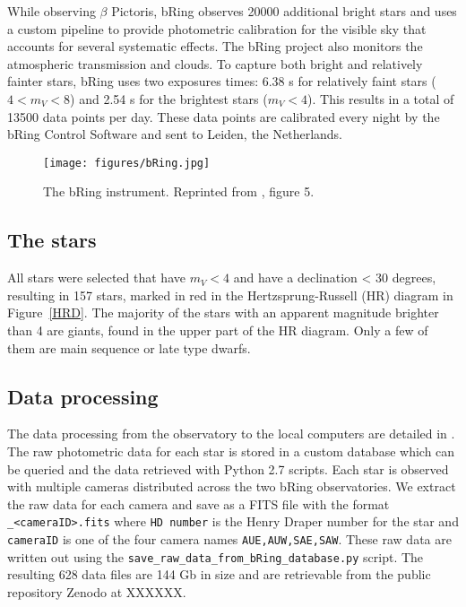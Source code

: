 \documentclass{aa}
\begin{document}
While observing $\beta$ Pictoris, bRing observes 20000 additional bright stars and uses a custom pipeline to provide photometric calibration for the visible sky that accounts for several systematic effects.
%
The bRing project also monitors the atmospheric transmission and clouds.
%
To capture both bright and relatively fainter stars, bRing uses two exposures times: 6.38 s for relatively faint stars ($4 < m_V < 8$) and 2.54 s for the brightest stars ($m_V < 4$). This results in a total of 13500 data points per day.
%
These data points are calibrated every night by the bRing Control Software and sent to Leiden, the Netherlands.

\begin{figure}
    \centering
    \texttt{[image: figures/bRing.jpg]}
    \caption{The bRing instrument. Reprinted from \cite{bRing}, figure 5.}
    \label{bRing}
\end{figure}

\subsection{The stars}

All stars were selected that have $m_V<4$ and have a declination < 30 degrees, resulting in 157 stars, marked in red in the Hertzsprung-Russell (HR) diagram in Figure~\ref{HRD}.
%
The majority of the stars with an apparent magnitude brighter than 4 are giants, found in the upper part of the HR diagram.
%
Only a few of them are main sequence or late type dwarfs.

\subsection{Data processing}

The data processing from the observatory to the local computers are detailed in \citet{Stuik_2014}.
%
The raw photometric data for each star is stored in a custom database which can be queried and the data retrieved with Python 2.7 scripts.
%
Each star is observed with multiple cameras distributed across the two bRing observatories.
%
We extract the raw data for each camera and save as a FITS file with the format {\tt <HD number>\_<cameraID>.fits} where {\tt HD number} is the Henry Draper number for the star and {\tt cameraID} is one of the four camera names {\tt AUE,AUW,SAE,SAW}.
%
These raw data are written out using the {\tt save\_raw\_data\_from\_bRing\_database.py} script.
%
The resulting 628 data files are 144 Gb in size and are retrievable from the public repository Zenodo at XXXXXX.
\end{document}
